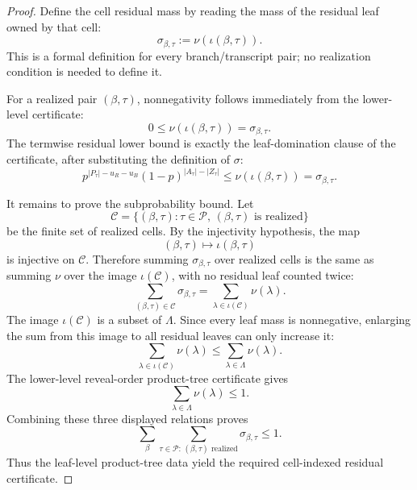 \begin{proof}
Define the cell residual mass by reading the mass of the residual leaf owned
by that cell:
\[
\sigma_{\beta,\tau}:=\nu(\iota(\beta,\tau)).
\]
This is a formal definition for every branch/transcript pair; no
realization condition is needed to define it.

For a realized pair \((\beta,\tau)\), nonnegativity follows immediately from
the lower-level certificate:
\[
0\le \nu(\iota(\beta,\tau))=\sigma_{\beta,\tau}.
\]
The termwise residual lower bound is exactly the leaf-domination clause of
the certificate, after substituting the definition of \(\sigma\):
\[
p^{|P_\tau|-u_R-u_B}(1-p)^{|A_\tau|-|Z_\tau|}
  \le \nu(\iota(\beta,\tau))
  = \sigma_{\beta,\tau}.
\]

It remains to prove the subprobability bound.  Let
\[
\mathcal C=\{(\beta,\tau):\tau\in\mathcal P,\,
(\beta,\tau)\text{ is realized}\}
\]
be the finite set of realized cells.  By the injectivity hypothesis, the map
\[
(\beta,\tau)\mapsto\iota(\beta,\tau)
\]
is injective on \(\mathcal C\).  Therefore summing \(\sigma_{\beta,\tau}\)
over realized cells is the same as summing \(\nu\) over the image
\(\iota(\mathcal C)\), with no residual leaf counted twice:
\[
\sum_{(\beta,\tau)\in\mathcal C}\sigma_{\beta,\tau}
=
\sum_{\lambda\in\iota(\mathcal C)}\nu(\lambda).
\]
The image \(\iota(\mathcal C)\) is a subset of \(\Lambda\).  Since every
leaf mass is nonnegative, enlarging the sum from this image to all residual
leaves can only increase it:
\[
\sum_{\lambda\in\iota(\mathcal C)}\nu(\lambda)
\le
\sum_{\lambda\in\Lambda}\nu(\lambda).
\]
The lower-level reveal-order product-tree certificate gives
\[
\sum_{\lambda\in\Lambda}\nu(\lambda)\le1.
\]
Combining these three displayed relations proves
\[
\sum_{\beta}\sum_{\tau\in\mathcal P:\,(\beta,\tau)\text{ realized}}
  \sigma_{\beta,\tau}\le1.
\]
Thus the leaf-level product-tree data yield the required cell-indexed
residual certificate.
\end{proof}
